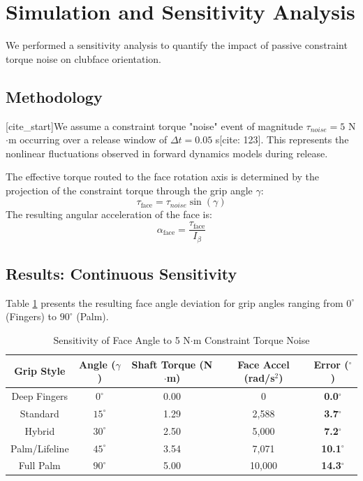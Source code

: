 \documentclass[11pt, letterpaper]{article}
\begin{document}
\section{Simulation and Sensitivity Analysis}

We performed a sensitivity analysis to quantify the impact of passive constraint torque noise on clubface orientation.

\subsection{Methodology}
[cite_start]We assume a constraint torque "noise" event of magnitude $\tau_{noise} = 5$ N$\cdot$m occurring over a release window of $\Delta t = 0.05$ s[cite: 123]. This represents the nonlinear fluctuations observed in forward dynamics models during release.

The effective torque routed to the face rotation axis is determined by the projection of the constraint torque through the grip angle $\gamma$:
\begin{equation}
    \tau_{\text{face}} = \tau_{noise} \sin(\gamma)
\end{equation}
The resulting angular acceleration of the face is:
\begin{equation}
    \alpha_{\text{face}} = \frac{\tau_{\text{face}}}{I_{\beta}}
\end{equation}

\subsection{Results: Continuous Sensitivity}

Table \ref{tab:sensitivity} presents the resulting face angle deviation for grip angles ranging from $0^\circ$ (Fingers) to $90^\circ$ (Palm).

\begin{table}[H]
\centering
\caption{Sensitivity of Face Angle to 5 N$\cdot$m Constraint Torque Noise}
\label{tab:sensitivity}
\begin{tabular}{ccccc}
\toprule
\textbf{Grip Style} & \textbf{Angle ($\gamma$)} & \textbf{Shaft Torque (N$\cdot$m)} & \textbf{Face Accel (rad/s$^2$)} & \textbf{Error ($^\circ$)} \\
\midrule
Deep Fingers & $0^\circ$ & 0.00 & 0 & \textbf{0.0$^\circ$} \\
Standard & $15^\circ$ & 1.29 & 2,588 & \textbf{3.7$^\circ$} \\
Hybrid & $30^\circ$ & 2.50 & 5,000 & \textbf{7.2$^\circ$} \\
Palm/Lifeline & $45^\circ$ & 3.54 & 7,071 & \textbf{10.1$^\circ$} \\
Full Palm & $90^\circ$ & 5.00 & 10,000 & \textbf{14.3$^\circ$} \\
\bottomrule
\end{tabular}
\end{table}
\end{document}
